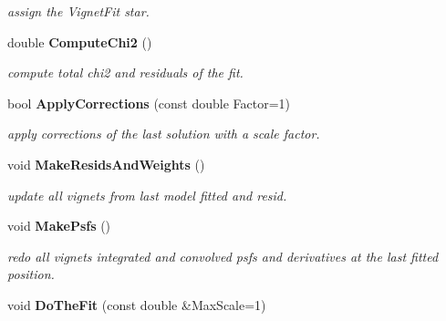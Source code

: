 \begin{CompactItemize}
\begin{CompactList}\small\item\em assign the Vignet\-Fit star.\item\end{CompactList}\item 
{}
double {\bf Compute\-Chi2} ()\label{class_simultaneousfit_a6}

\begin{CompactList}\small\item\em compute total chi2 and residuals of the fit.\item\end{CompactList}\item 
{}
bool {\bf Apply\-Corrections} (const double Factor=1)\label{class_simultaneousfit_a7}

\begin{CompactList}\small\item\em apply corrections of the last solution with a scale factor.\item\end{CompactList}\item 
{}
void {\bf Make\-Resids\-And\-Weights} ()\label{class_simultaneousfit_a8}

\begin{CompactList}\small\item\em update all vignets from last model fitted and resid.\item\end{CompactList}\item 
{}
void {\bf Make\-Psfs} ()\label{class_simultaneousfit_a9}

\begin{CompactList}\small\item\em redo all vignets integrated and convolved psfs and derivatives at the last fitted position.\item\end{CompactList}\item 
{}
void {\bf Do\-The\-Fit} (const double \&Max\-Scale=1)\label{class_simultaneousfit_a10}


\end{CompactItemize}
